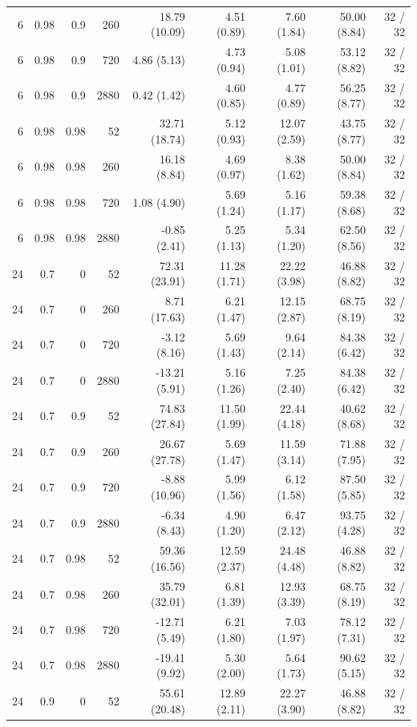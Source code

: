\begin{longtable}{rrrrrrrrr}
6 & 0.98 & 0.9 & 260 & 18.79 (10.09) & 4.51 (0.89) & 7.60 (1.84) & 50.00 (8.84) & 32 / 32\\
6 & 0.98 & 0.9 & 720 & 4.86 (5.13) & 4.73 (0.94) & 5.08 (1.01) & 53.12 (8.82) & 32 / 32\\
6 & 0.98 & 0.9 & 2880 & 0.42 (1.42) & 4.60 (0.85) & 4.77 (0.89) & 56.25 (8.77) & 32 / 32\\
6 & 0.98 & 0.98 & 52 & 32.71 (18.74) & 5.12 (0.93) & 12.07 (2.59) & 43.75 (8.77) & 32 / 32\\
6 & 0.98 & 0.98 & 260 & 16.18 (8.84) & 4.69 (0.97) & 8.38 (1.62) & 50.00 (8.84) & 32 / 32\\
6 & 0.98 & 0.98 & 720 & 1.08 (4.90) & 5.69 (1.24) & 5.16 (1.17) & 59.38 (8.68) & 32 / 32\\
6 & 0.98 & 0.98 & 2880 & -0.85 (2.41) & 5.25 (1.13) & 5.34 (1.20) & 62.50 (8.56) & 32 / 32\\
24 & 0.7 & 0 & 52 & 72.31 (23.91) & 11.28 (1.71) & 22.22 (3.98) & 46.88 (8.82) & 32 / 32\\
24 & 0.7 & 0 & 260 & 8.71 (17.63) & 6.21 (1.47) & 12.15 (2.87) & 68.75 (8.19) & 32 / 32\\
24 & 0.7 & 0 & 720 & -3.12 (8.16) & 5.69 (1.43) & 9.64 (2.14) & 84.38 (6.42) & 32 / 32\\
24 & 0.7 & 0 & 2880 & -13.21 (5.91) & 5.16 (1.26) & 7.25 (2.40) & 84.38 (6.42) & 32 / 32\\
24 & 0.7 & 0.9 & 52 & 74.83 (27.84) & 11.50 (1.99) & 22.44 (4.18) & 40.62 (8.68) & 32 / 32\\
24 & 0.7 & 0.9 & 260 & 26.67 (27.78) & 5.69 (1.47) & 11.59 (3.14) & 71.88 (7.95) & 32 / 32\\
24 & 0.7 & 0.9 & 720 & -8.88 (10.96) & 5.99 (1.56) & 6.12 (1.58) & 87.50 (5.85) & 32 / 32\\
24 & 0.7 & 0.9 & 2880 & -6.34 (8.43) & 4.90 (1.20) & 6.47 (2.12) & 93.75 (4.28) & 32 / 32\\
24 & 0.7 & 0.98 & 52 & 59.36 (16.56) & 12.59 (2.37) & 24.48 (4.48) & 46.88 (8.82) & 32 / 32\\
24 & 0.7 & 0.98 & 260 & 35.79 (32.01) & 6.81 (1.39) & 12.93 (3.39) & 68.75 (8.19) & 32 / 32\\
24 & 0.7 & 0.98 & 720 & -12.71 (5.49) & 6.21 (1.80) & 7.03 (1.97) & 78.12 (7.31) & 32 / 32\\
24 & 0.7 & 0.98 & 2880 & -19.41 (9.92) & 5.30 (2.00) & 5.64 (1.73) & 90.62 (5.15) & 32 / 32\\
24 & 0.9 & 0 & 52 & 55.61 (20.48) & 12.89 (2.11) & 22.27 (3.90) & 46.88 (8.82) & 32 / 32\\

\end{longtable}

